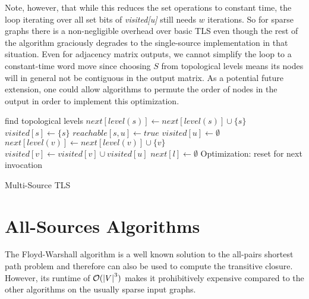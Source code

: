 \documentclass[12pt,a4paper,twoside]{article}
\begin{document}
Note, however, that while this reduces the set operations to constant time, the loop iterating over all set bits of \emph{visited[u]} still needs $w$ iterations. So for sparse graphs there is a non-negligible overhead over basic TLS even though the rest of the algorithm graciously degrades to the single-source implementation in that situation. Even for adjacency matrix outputs, we cannot simplify the loop to a constant-time word move since choosing $S$ from topological levels means its nodes will in general not be contiguous in the output matrix. As a potential future extension, one could allow algorithms to permute the order of nodes in the output in order to implement this optimization.

\begin{algorithm}
  \begin{algorithmic}
      \State find topological levels
        \State $next[level(s)] \gets next[level(s)] \cup \{s\}$
        \State $visited[s] \gets \{s\}$
      \EndFor
            \State $reachable[s, u] \gets true$
          \EndFor
          \State $visited[u] \gets \emptyset$
              \State $next[level(v)] \gets next[level(v)] \cup \{v\}$
            \EndIf
            \State $visited[v] \gets visited[v] \cup visited[u]$
          \EndFor
        \EndFor
        \State $next[l] \gets \emptyset$ \Comment Optimization: reset for next invocation
      \EndFor
    \EndFunction
  \end{algorithmic}
  \caption{Multi-Source TLS}
  \label{algo:MultiTLS}
\end{algorithm}

\section{All-Sources Algorithms}

The Floyd-Warshall algorithm is a well known solution to the all-pairs shortest path problem and therefore can also be used to compute the transitive closure. However, its runtime of $\mathcal{O}(\left|V\right|^3)$ makes it prohibitively expensive compared to the other algorithms on the usually sparse input graphs.
\end{document}
